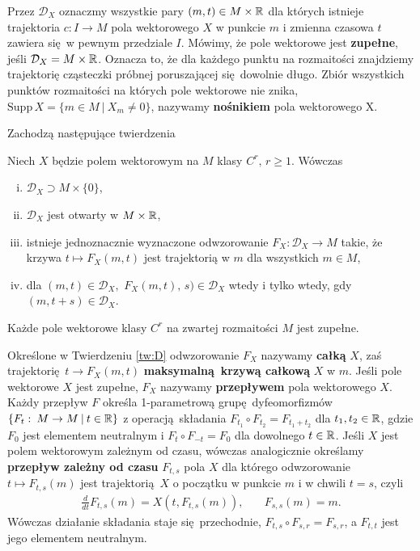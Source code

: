 Przez \(\mathcal{D}_X\) oznaczmy wszystkie pary \((m, t)\in M \times \mathbb{R}\) dla których istnieje trajektoria \(c: I\rightarrow M\) pola wektorowego \(X\) w punkcie \(m\) i zmienna czasowa \(t\) zawiera się w pewnym przedziale \(I\). Mówimy, że pole wektorowe jest \textbf{zupełne}, jeśli \(\mathcal{D}_X = M \times \mathbb{R}\). Oznacza to, że dla każdego punktu na rozmaitości znajdziemy trajektorię cząsteczki próbnej poruszającej się dowolnie długo. Zbiór wszystkich punktów rozmaitości na których pole wektorowe nie znika, \(\mathrm{Supp}\,X=\{m\in M\:|\: X_m\neq 0\}\), nazywamy \textbf{nośnikiem} pola wektorowego X. 

Zachodzą następujące twierdzenia

\begin{twierdzenie}\label{tw:D}
Niech \(X\) będzie polem wektorowym na \(M\) klasy \(C^r,\, r\geq1\). Wówczas
\begin{enumerate}[i)]
\item \(\mathcal{D}_X\supset M\times \{0\}\),
\item \(\mathcal{D}_X\) jest otwarty w \(M\times \mathbb{R}\),
\item istnieje jednoznacznie wyznaczone odwzorowanie \(F_X:\mathcal{D}_X\rightarrow M\) takie, że krzywa \(t\mapsto F_X(m,t)\) jest trajektorią w \(m\) dla wszystkich \(m\in M\),
\item dla \((m,t)\in \mathcal{D}_X,\) \(F_X(m,t),\, s)\in\mathcal{D}_X\) wtedy i tylko wtedy, gdy \((m, t+s)\in \mathcal{D}_X\).
\end{enumerate}
\end{twierdzenie}  

\begin{twierdzenie}
Każde pole wektorowe klasy \(C^r\) na zwartej rozmaitości \(M\) jest zupełne.
\end{twierdzenie}

Określone w Twierdzeniu \ref{tw:D} odwzorowanie \(F_X\) nazywamy \textbf{całką} \(X\), zaś trajektorię \(t\rightarrow F_X(m,t)\) \textbf{maksymalną krzywą całkową} \(X\) w \(m\). Jeśli pole wektorowe \(X\) jest zupełne, \(F_X\) nazywamy \textbf{przepływem} pola wektorowego \(X\). Każdy przepływ \(F\) określa 1-parametrową grupę dyfeomorfizmów \(\{F_t:\:M\rightarrow M\:|\: t\in \mathbb{R}\}\) z operacją składania \(F_{t_1}\circ F_{t_2} = F_{t_1 + t_2}\) dla \(t_{1}, {t}_2 \in \mathbb{R}\), gdzie \(F_0\) jest elementem neutralnym i \(F_{t}\circ F_{-t} = F_{0}\) dla dowolnego \(t\in\mathbb{R}\). Jeśli \(X\) jest polem wektorowym zależnym od czasu, wówczas analogicznie określamy \textbf{przepływ zależny od czasu} \(F_{t,s}\) pola \(X\) dla którego odwzorowanie \(t\mapsto F_{t,s}(m)\) jest trajektorią \(X\) o początku w punkcie \(m\) i w chwili \(t=s\), czyli
\begin{align}
\frac{d}{dt}F_{t,s}(m) = X\left(t, F_{t,s}(m)\right), &\quad F_{s,s}(m) = m.
\end{align} 
Wówczas działanie składania staje się przechodnie, \(F_{t,s}\circ F_{s,r} = F_{s, r}\), a \(F_{t, t}\) jest jego elementem neutralnym. 

